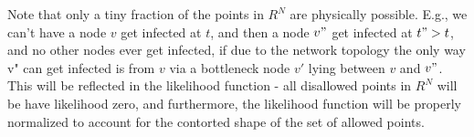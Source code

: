 \documentclass{article}
\begin{document}

	






	



	Note that only a tiny fraction of the points in $R^{N}$ are physically
	possible. E.g., we can't have a node $v$ get infected at $t$, and then a
	node $v"$ get infected at $t" > t$, and no other nodes ever get infected,
	if due to the network topology the only way v" can get infected is
	from $v$ via a bottleneck node $v'$ lying between $v$ and $v"$. This will be
	reflected in the likelihood function - all disallowed points in $R^{N}$
	will be have likelihood zero, and furthermore, the likelihood function
	will be properly normalized to account for the contorted shape of the
	set of allowed points.
\end{document}
